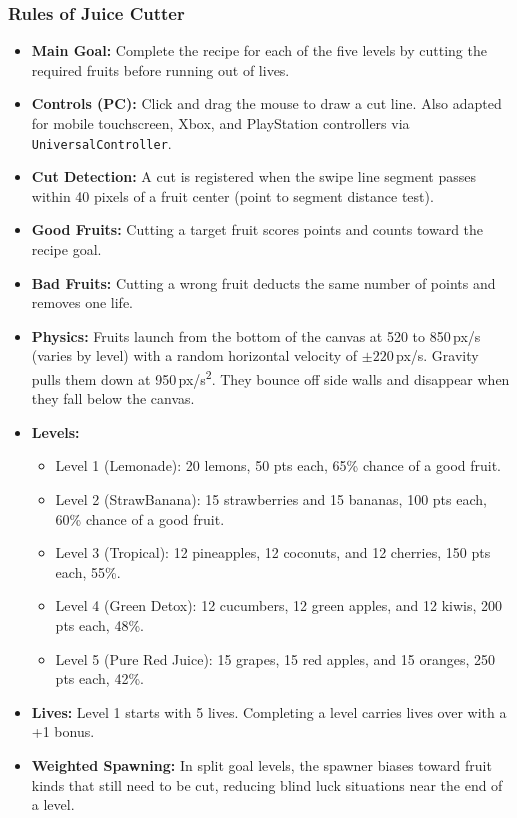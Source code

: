 \documentclass[12pt,letterpaper]{article}
\begin{document}
\subsubsection{Rules of Juice Cutter}
\begin{itemize}
  \item \textbf{Main Goal:} Complete the recipe for each of the five levels by cutting the required fruits before running out of lives.
  \item \textbf{Controls (PC):} Click and drag the mouse to draw a cut line. Also adapted for mobile touchscreen, Xbox, and PlayStation controllers via \texttt{UniversalController}.
  \item \textbf{Cut Detection:} A cut is registered when the swipe line segment passes within 40 pixels of a fruit center (point to segment distance test).
  \item \textbf{Good Fruits:} Cutting a target fruit scores points and counts toward the recipe goal.
  \item \textbf{Bad Fruits:} Cutting a wrong fruit deducts the same number of points and removes one life.
  \item \textbf{Physics:} Fruits launch from the bottom of the canvas at 520 to 850\,px/s (varies by level) with a random horizontal velocity of $\pm220$\,px/s. Gravity pulls them down at 950\,px/s\textsuperscript{2}. They bounce off side walls and disappear when they fall below the canvas.
  \item \textbf{Levels:}
  \begin{itemize}
    \item Level 1 (Lemonade): 20 lemons, 50 pts each, 65\% chance of a good fruit.
    \item Level 2 (StrawBanana): 15 strawberries and 15 bananas, 100 pts each, 60\% chance of a good fruit.
    \item Level 3 (Tropical): 12 pineapples, 12 coconuts, and 12 cherries, 150 pts each, 55\%.
    \item Level 4 (Green Detox): 12 cucumbers, 12 green apples, and 12 kiwis, 200 pts each, 48\%.
    \item Level 5 (Pure Red Juice): 15 grapes, 15 red apples, and 15 oranges, 250 pts each, 42\%.
  \end{itemize}
  \item \textbf{Lives:} Level 1 starts with 5 lives. Completing a level carries lives over with a +1 bonus.
  \item \textbf{Weighted Spawning:} In split goal levels, the spawner biases toward fruit kinds that still need to be cut, reducing blind luck situations near the end of a level.
\end{itemize}
\end{document}
